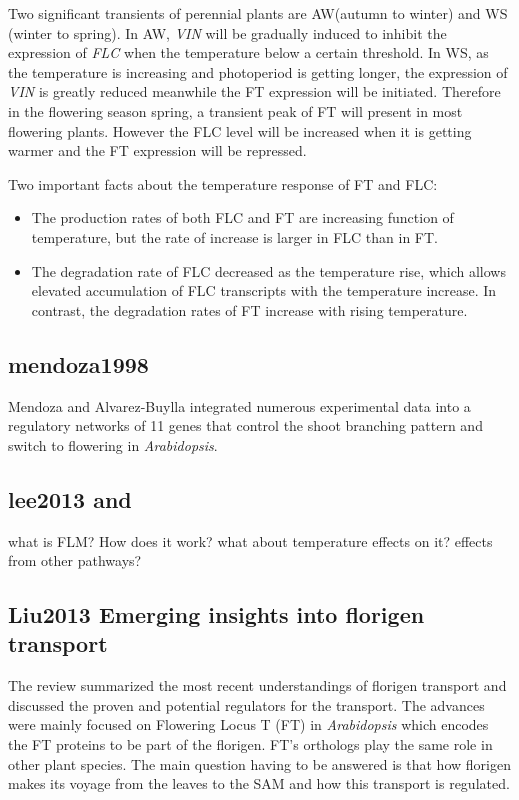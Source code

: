 \documentclass[paper=a4, fontsize=12pt]{scrartcl}	%
\numberwithin{equation}{section}					%
\numberwithin{figure}{section}					%
\numberwithin{table}{section}					%
\begin{document}
Two significant transients of perennial plants are AW(autumn to winter) and WS (winter to spring). In AW, \emph{VIN} will be gradually induced to inhibit the expression of \emph{FLC} when the temperature below a certain threshold. In WS, as the temperature is increasing and photoperiod is getting longer, the expression of \emph{VIN} is greatly reduced meanwhile the FT expression will be initiated. Therefore in the flowering season spring, a transient peak of FT will present in most flowering plants. However the FLC level will be increased when it is getting warmer and the FT expression will be repressed. 

Two important facts about the temperature response of FT and FLC:
\begin{itemize}
\item The production rates of both FLC and FT are increasing function of temperature, but the rate of increase is larger in FLC than in FT. 
\item The degradation rate of FLC decreased as the temperature rise, which allows elevated accumulation of FLC transcripts with the temperature increase. In contrast, the degradation rates of FT increase with rising temperature. 
\end{itemize}
\subsection{mendoza1998}
Mendoza and Alvarez-Buylla \cite{mendoza1998} integrated numerous experimental data into a regulatory networks of 11 genes that control the shoot branching pattern and switch to flowering in {\it Arabidopsis}.  

\subsection{lee2013 and }
\cite{lee2013} what is FLM? How does it work? what about temperature effects on it? effects from other pathways?


\subsection{Liu2013 Emerging insights into florigen transport}
The review summarized the most recent understandings of florigen transport and discussed the proven and potential regulators for the transport. The advances were mainly focused on Flowering Locus T (FT) in {\it Arabidopsis} which encodes the FT proteins to be part of the florigen. FT's orthologs play the same role in other plant species. The main question having to be answered is that how florigen makes its voyage from the leaves to the SAM and how this transport is regulated. 
\end{document}
